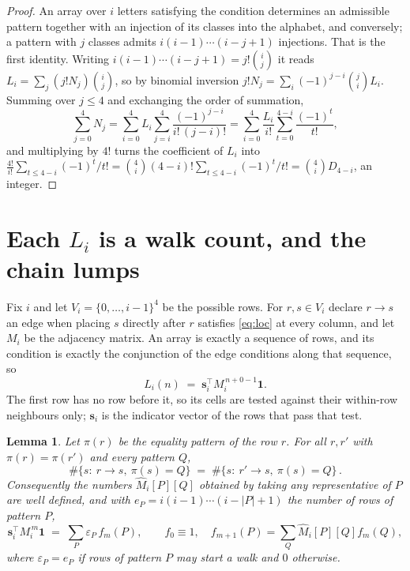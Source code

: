 \documentclass[11pt,a4paper]{article}
\theoremstyle{plain}
\newtheorem{lemma}[theorem]{Lemma}
\theoremstyle{definition}
\begin{document}
\begin{proof}
An array over $i$ letters satisfying the condition determines an admissible pattern together
with an injection of its classes into the alphabet, and conversely; a pattern with $j$
classes admits $i(i-1)\cdots(i-j+1)$ injections. That is the first identity. Writing
$i(i-1)\cdots(i-j+1)=j!\binom{i}{j}$ it reads $L_i=\sum_j (j!N_j)\binom{i}{j}$, so by
binomial inversion $j!N_j=\sum_{i}(-1)^{j-i}\binom{j}{i}L_i$. Summing over
$j\le 4$ and exchanging the order of summation,
\[
\sum_{j=0}^{4}N_j=\sum_{i=0}^{4}L_i\sum_{j=i}^{4}\frac{(-1)^{j-i}}{i!\,(j-i)!}
=\sum_{i=0}^{4}\frac{L_i}{i!}\sum_{t=0}^{4-i}\frac{(-1)^t}{t!} ,
\]
and multiplying by $4!$ turns the coefficient of $L_i$ into
$\frac{4!}{i!}\sum_{t\le 4-i}(-1)^t/t!=\binom{4}{i}(4-i)!\sum_{t\le 4-i}(-1)^t/t!
=\binom{4}{i}D_{4-i}$, an integer.
\end{proof}

\section{Each $L_i$ is a walk count, and the chain lumps}

Fix $i$ and let $V_i=\{0,\dots,i-1\}^{4}$ be the possible rows. For $r,s\in V_i$
declare $r\to s$ an edge when placing $s$ directly after $r$ satisfies \eqref{eq:loc} at
every column, and let $M_i$ be the adjacency matrix. An array is exactly a sequence of
rows, and its condition is exactly the conjunction of the edge conditions along that
sequence, so
\[
L_i(n)\;=\;\mathbf{s}_i^{\!\top}M_i^{\,n+0-1}\mathbf{1} .
\]
The first row has no row before it, so its cells are tested
against their within-row neighbours only; $\mathbf{s}_i$ is the indicator vector of the
rows that pass that test.

\begin{lemma}\label{lem:lump}
Let $\pi(r)$ be the equality pattern of the row $r$. For all $r,r'$ with
$\pi(r)=\pi(r')$ and every pattern $Q$,
\[
\#\{s:\ r\to s,\ \pi(s)=Q\}\;=\;\#\{s:\ r'\to s,\ \pi(s)=Q\}\, .
\]
Consequently the numbers $\widehat M_i[P][Q]$ obtained by taking any representative of $P$
are well defined, and with $e_P=i(i-1)\cdots(i-|P|+1)$ the number of rows of pattern $P$,
\[
\mathbf{s}_i^{\!\top}M_i^{\,m}\mathbf{1}\;=\;\sum_P \varepsilon_P\,f_m(P),
\qquad f_0\equiv1,\quad f_{m+1}(P)=\sum_Q\widehat M_i[P][Q]f_m(Q),
\]
where $\varepsilon_P=e_P$ if rows of pattern $P$ may start a walk and $0$ otherwise.
\end{lemma}
\end{document}
